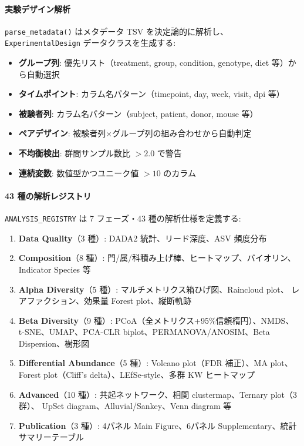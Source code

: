 \documentclass[12pt, a4paper]{article}
\begin{document}
\paragraph{実験デザイン解析}
\texttt{parse\_metadata()} はメタデータ TSV を決定論的に解析し、
\texttt{ExperimentalDesign} データクラスを生成する:
\begin{itemize}[nosep]
  \item \textbf{グループ列}: 優先リスト（treatment, group, condition, genotype, diet 等）から自動選択
  \item \textbf{タイムポイント}: カラム名パターン（timepoint, day, week, visit, dpi 等）
  \item \textbf{被験者列}: カラム名パターン（subject, patient, donor, mouse 等）
  \item \textbf{ペアデザイン}: 被験者列$\times$グループ列の組み合わせから自動判定
  \item \textbf{不均衡検出}: 群間サンプル数比 $> 2.0$ で警告
  \item \textbf{連続変数}: 数値型かつユニーク値 $> 10$ のカラム
\end{itemize}

\paragraph{43 種の解析レジストリ}
\texttt{ANALYSIS\_REGISTRY} は 7 フェーズ・43 種の解析仕様を定義する:
\begin{enumerate}[nosep]
  \item \textbf{Data Quality}（3 種）: DADA2 統計、リード深度、ASV 頻度分布
  \item \textbf{Composition}（8 種）: 門/属/科積み上げ棒、ヒートマップ、バイオリン、
    Indicator Species 等
  \item \textbf{Alpha Diversity}（5 種）: マルチメトリクス箱ひげ図、Raincloud plot、
    レアファクション、効果量 Forest plot、縦断軌跡
  \item \textbf{Beta Diversity}（9 種）: PCoA（全メトリクス+95\%信頼楕円）、NMDS、
    t-SNE、UMAP、PCA-CLR biplot、PERMANOVA/ANOSIM、Beta Dispersion、樹形図
  \item \textbf{Differential Abundance}（5 種）: Volcano plot（FDR 補正）、MA plot、
    Forest plot（Cliff's delta）、LEfSe-style、多群 KW ヒートマップ
  \item \textbf{Advanced}（10 種）: 共起ネットワーク、相関 clustermap、Ternary plot（3群）、
    UpSet diagram、Alluvial/Sankey、Venn diagram 等
  \item \textbf{Publication}（3 種）: 4パネル Main Figure、6パネル Supplementary、統計サマリーテーブル
\end{enumerate}
\end{document}
